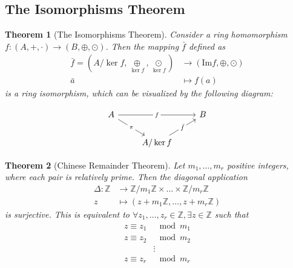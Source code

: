\documentclass[12pt,a4paper]{article}
\newtheorem{theorem}{Theorem}[section]
\theoremstyle{definition}
\begin{document}
\subsection{The Isomorphisms Theorem}

\begin{theorem}[The Isomorphisms Theorem]
Consider a ring homomorphism $f : (A, +, \cdot) \to (B, \oplus, \odot)$. Then the mapping $\bar{f}$ defined as
\begin{equation*}
\begin{aligned}
\bar{f} = (A/ \ker f, \underset{\ker f}{\oplus}, \underset{\ker f}{\odot}) & \to (\text{Im} f, \oplus, \odot) \\
\bar{a} & \mapsto f(a)
\end{aligned}
\end{equation*}
is a ring isomorphism, which can be visualized by the following diagram:

\[\begin{tikzcd}
	A && B \\
	& {A/ \ker f}
	\arrow["{\bar{f}}"{description}, from=2-2, to=1-3]
	\arrow["f"{description}, from=1-1, to=1-3]
	\arrow["\pi"{description}, from=1-1, to=2-2]
\end{tikzcd}\]

\end{theorem}

\begin{theorem}[Chinese Remainder Theorem]
Let $m_1, \ldots, m_r$ positive integers, where each pair is relatively prime. Then the diagonal application
\begin{equation*}
\begin{aligned}
\Delta : \mathbb{Z} & \to \mathbb{Z}/m_1\mathbb{Z} \times \ldots \times \mathbb{Z}/m_r \mathbb{Z} \\
z & \mapsto (z+m_1\mathbb{Z}, \ldots, z+m_r\mathbb{Z})
\end{aligned}
\end{equation*}
is surjective. This is equivalent to $\forall z_1, \ldots, z_r \in \mathbb{Z}, \exists z \in \mathbb{Z}$ such that
\begin{equation*}
\begin{aligned}
z \equiv z_1 & \mod m_1  \\
z \equiv z_2 & \mod m_2  \\
& \vdots \\
z \equiv z_r & \mod m_r  \\
\end{aligned}
\end{equation*}
\end{theorem}
\end{document}
